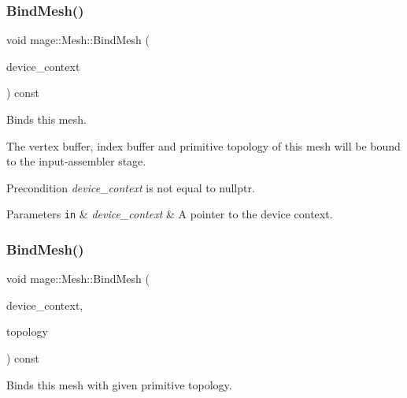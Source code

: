 \subsubsection{\texorpdfstring{Bind\+Mesh()}{BindMesh()}\hspace{0.1cm}{\footnotesize\ttfamily [1/2]}}
{\footnotesize\ttfamily void mage\+::\+Mesh\+::\+Bind\+Mesh (\begin{DoxyParamCaption}\item[{I\+D3\+D11\+Device\+Context4 $\ast$}]{device\+\_\+context }\end{DoxyParamCaption}) const\hspace{0.3cm}{\ttfamily [noexcept]}}

Binds this mesh.

The vertex buffer, index buffer and primitive topology of this mesh will be bound to the input-\/assembler stage.

\begin{DoxyPrecond}{Precondition}
{\itshape device\+\_\+context} is not equal to {\ttfamily nullptr}. 
\end{DoxyPrecond}

\begin{DoxyParams}[1]{Parameters}
\mbox{\tt in}  & {\em device\+\_\+context} & A pointer to the device context. \\
\hline
\end{DoxyParams}
\hypertarget{classmage_1_1_mesh_a427afc68defc641bb020facdd07575f9}{}\label{classmage_1_1_mesh_a427afc68defc641bb020facdd07575f9} 
\subsubsection{\texorpdfstring{Bind\+Mesh()}{BindMesh()}\hspace{0.1cm}{\footnotesize\ttfamily [2/2]}}
{\footnotesize\ttfamily void mage\+::\+Mesh\+::\+Bind\+Mesh (\begin{DoxyParamCaption}\item[{I\+D3\+D11\+Device\+Context4 $\ast$}]{device\+\_\+context,  }\item[{D3\+D11\+\_\+\+P\+R\+I\+M\+I\+T\+I\+V\+E\+\_\+\+T\+O\+P\+O\+L\+O\+GY}]{topology }\end{DoxyParamCaption}) const\hspace{0.3cm}{\ttfamily [noexcept]}}

Binds this mesh with given primitive topology.


